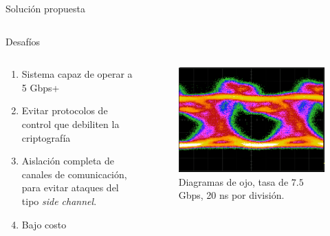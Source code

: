 \documentclass[aspectratio=169]{beamer}
\begin{document}
\begin{frame}{Solución propuesta}
\begin{columns}
\begin{column}{0.40\textwidth}
  \end{column}
\end{columns}

\end{frame}

\begin{frame}{Desafíos}
\begin{columns}
  \begin{column}{0.60\textwidth}

\begin{enumerate}
 \item Sistema capaz de operar a 5 Gbps+
 \item Evitar protocolos de control que debiliten la criptografía
 \item Aislación completa de canales de comunicación, para evitar ataques del tipo \textit{side channel}.
 \item Bajo costo
 \end{enumerate}

  \end{column}
  \begin{column}{0.40\textwidth}
 
 
 \begin{figure}[!t]
   \centering
   \includegraphics[width=0.80 \textwidth]{../graphs/medicionesPaper/eye71G.png}
   \qquad
   Diagramas de ojo, tasa de $7.5$ Gbps, 20 ns por división.
  \label{fig:ImgOjo}
\end{figure}


\end{column}
\end{columns}

\end{frame}
\end{document}
